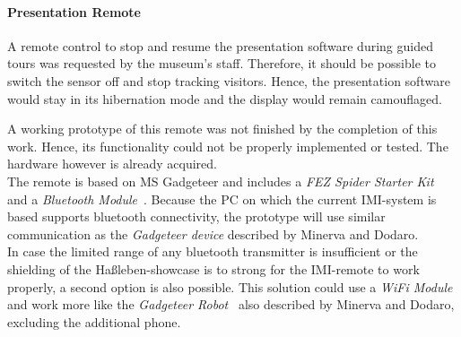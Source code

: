 %


\paragraph{Presentation Remote}

A remote control to stop and resume the presentation software during guided tours was requested by the museum's staff. Therefore, it should be possible to switch the sensor off and stop tracking visitors. Hence, the presentation software would stay in its hibernation mode and the display would remain camouflaged. 

A working prototype of this remote was not finished by the completion of this work. Hence, its functionality could not be properly implemented or tested. The hardware however is already acquired.
\\
The remote is based on \ac{MS} Gadgeteer and includes a \textit{FEZ Spider Starter Kit}~\cite{SpiderKitGHI} and a \textit{Bluetooth Module}~\cite{BluetoothGHI}. Because the PC on which the current \ac{IMI}-system is based supports bluetooth connectivity, the prototype will use similar communication as the \textit{Gadgeteer device}\cite{RemoteBluetooth} described by Minerva and Dodaro.
\\
In case the limited range of any bluetooth transmitter is insufficient or the shielding of the Haßleben-showcase is to strong for the \ac{IMI}-remote to work properly, a second option is also possible. This solution could use a \textit{WiFi Module}~\cite{WiFiGHI} and work more like the \textit{Gadgeteer Robot}~\cite{RemoteWiFi} also described by Minerva and Dodaro, excluding the additional phone.

